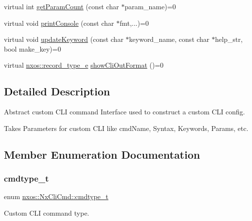 \begin{DoxyCompactItemize}
\item 
virtual int \mbox{\hyperlink{classnxos_1_1_nx_cli_cmd_a12e56ced4646ba1a27417030c0d20e7b}{get\+Param\+Count}} (const char $\ast$param\+\_\+name)=0
\item 
virtual void \mbox{\hyperlink{classnxos_1_1_nx_cli_cmd_a10c723c79d75ac2c85821b5ca6540c62}{print\+Console}} (const char $\ast$fmt,...)=0
\item 
virtual void \mbox{\hyperlink{classnxos_1_1_nx_cli_cmd_ae1669d9fbeaa164494a503379ca52b86}{update\+Keyword}} (const char $\ast$keyword\+\_\+name, const char $\ast$help\+\_\+str, bool make\+\_\+key)=0
\item 
virtual \mbox{\hyperlink{nx__common_8h_a8952d5a318ed66cef9c7a83c7fd3ae91}{nxos\+::record\+\_\+type\+\_\+e}} \mbox{\hyperlink{classnxos_1_1_nx_cli_cmd_a71600fafefdd017050e3a357f03ddd24}{show\+Cli\+Out\+Format}} ()=0
\end{DoxyCompactItemize}


\subsection{Detailed Description}
Abstract custom C\+LI command Interface used to construct a custom C\+LI config. 

Takes Parameters for custom C\+LI like cmd\+Name, Syntax, Keywords, Params, etc. 

\subsection{Member Enumeration Documentation}
\mbox{\label{classnxos_1_1_nx_cli_cmd_a82ed104f13c7859b24d3c0527f706be1}} 
\subsubsection{\texorpdfstring{cmdtype\+\_\+t}{cmdtype\_t}}
{\footnotesize\ttfamily enum \mbox{\hyperlink{classnxos_1_1_nx_cli_cmd_a82ed104f13c7859b24d3c0527f706be1}{nxos\+::\+Nx\+Cli\+Cmd\+::cmdtype\+\_\+t}}}



Custom C\+LI command type. 

